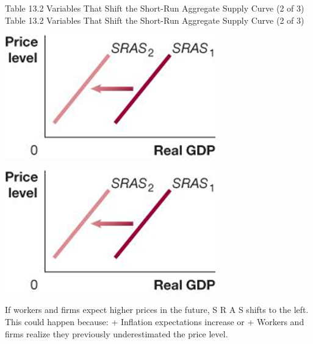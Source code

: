 \documentclass[
  12pt,
  ignorenonframetext,
]{beamer}
\begin{document}
\begin{frame}{Table 13.2 Variables That Shift the Short-Run Aggregate
Supply Curve (2 of 3)}
\protect\hypertarget{table-13.2-variables-that-shift-the-short-run-aggregate-supply-curve-2-of-3}{}
Table 13.2 Variables That Shift the Short-Run Aggregate Supply Curve (2
of 3)

\includegraphics[width=\textwidth,height=0.99\textheight]{imgs3/img_slide28a.png}

\includegraphics[width=\textwidth,height=0.99\textheight]{imgs3/img_slide28b.png}

If workers and firms expect higher prices in the future, S R A S shifts
to the left. This could happen because: + Inflation expectations
increase or + Workers and firms realize they previously underestimated
the price level.
\end{frame}
\end{document}
